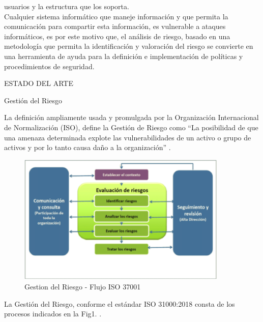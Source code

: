 \documentclass[a4paper,12pt]{article}
\begin{document}
usuarios y la estructura que los soporta.\\
Cualquier sistema informático que maneje información y que permita la comunicación 
para compartir esta información, es vulnerable a ataques informáticos, es por 
este motivo que, el análisis de riesgo, basado en una metodología que permita la identificación y valoración del riesgo se convierte en una herramienta 
de ayuda para la definición e implementación de políticas y procedimientos de 
seguridad.\\
\begin{bf}
\begin{center}
ESTADO DEL ARTE\\
\end{center}
\end{bf}
\begin{bf}   
Gestión del Riesgo\\
\end{bf}
La definición ampliamente usada y promulgada por la Organización Internacional de 
Normalización (ISO), define la Gestión de Riesgo como “La posibilidad de que una 
amenaza determinada explote las vulnerabilidades de un activo o grupo de activos y 
por lo tanto causa daño a la organización” \cite{Institute2009}.
\begin{figure}[h]
   \centering
   \includegraphics[width=10cm]{Manejo_Riesgo_ISO-31000.png}
   \caption{Gestion del Riesgo - Flujo ISO 37001}
\end{figure}
La Gestión del Riesgo, conforme el estándar ISO 31000:2018 consta de los procesos indicados en la 
Fig1. \cite{Grupo2018}.
\end{document}
